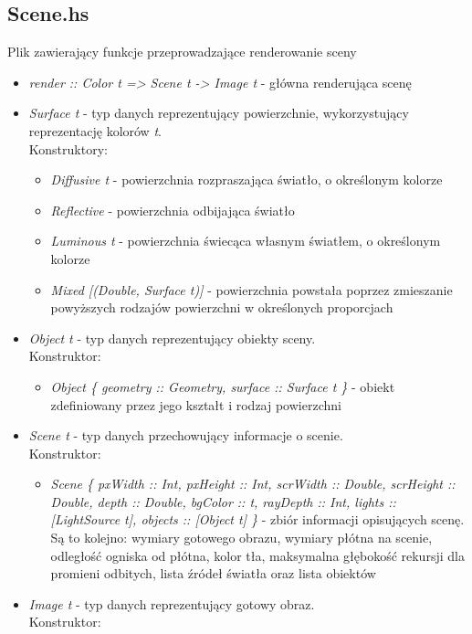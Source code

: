 \documentclass[11pt,a4paper]{article}
\begin{document}
\subsection{Scene.hs}
Plik zawierający funkcje przeprowadzające renderowanie sceny
\begin{itemize}
\item\textit{render :: Color t => Scene t -> Image t} - główna renderująca scenę
\item\textit{Surface t} - typ danych reprezentujący powierzchnie, wykorzystujący reprezentację kolorów \textit{t}.\\Konstruktory:
\begin{itemize}
\item\textit{Diffusive t} - powierzchnia rozpraszająca światło, o określonym kolorze
\item\textit{Reflective} - powierzchnia odbijająca światło
\item\textit{Luminous t} - powierzchnia świecąca własnym światłem, o określonym kolorze
\item\textit{Mixed [(Double, Surface t)]} - powierzchnia powstała poprzez zmieszanie powyższych rodzajów powierzchni w określonych proporcjach
\end{itemize}
\item\textit{Object t} - typ danych reprezentujący obiekty sceny.\\Konstruktor:
\begin{itemize}
\item\textit{Object \{
    geometry :: Geometry,
    surface :: Surface t
\}} - obiekt zdefiniowany przez jego kształt i rodzaj powierzchni
\end{itemize}
\item\textit{Scene t} - typ danych przechowujący informacje o scenie.\\Konstruktor:
\begin{itemize}
\item\textit{Scene \{
    pxWidth :: Int,
    pxHeight :: Int,
    scrWidth :: Double,
    scrHeight :: Double,
    depth :: Double,
    bgColor :: t,
    rayDepth :: Int,
    lights :: [LightSource t],
    objects :: [Object t]
\}} - zbiór informacji opisujących scenę. Są to kolejno: wymiary gotowego obrazu, wymiary płótna na scenie, odległość ogniska od płótna, kolor tła, maksymalna głębokość rekursji dla promieni odbitych, lista źródeł światła oraz lista obiektów
\end{itemize}
\item\textit{Image t} - typ danych reprezentujący gotowy obraz.\\Konstruktor:

\end{itemize}
\end{document}
